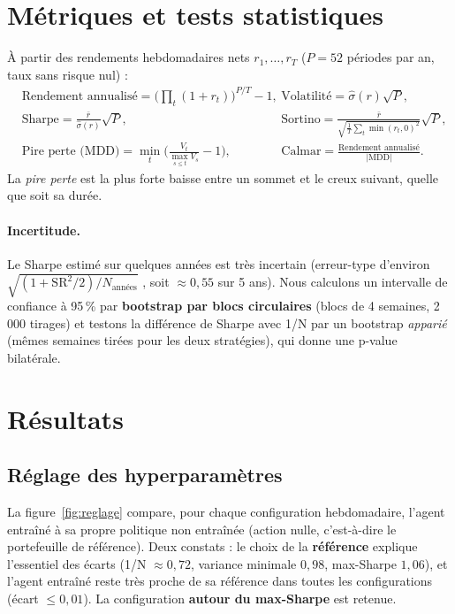 \documentclass[11pt,a4paper]{article}
\begin{document}
\section{Métriques et tests statistiques}

À partir des rendements hebdomadaires nets \(r_1,\dots,r_T\) (\(P=52\) périodes par an, taux sans risque nul) :
\begin{align*}
  &\text{Rendement annualisé} = \Big(\prod_t(1+r_t)\Big)^{P/T}-1, &&\text{Volatilité} = \hat\sigma(r)\sqrt P,\\
  &\text{Sharpe} = \frac{\bar r}{\hat\sigma(r)}\sqrt P, &&\text{Sortino} = \frac{\bar r}{\sqrt{\tfrac1T\sum_t\min(r_t,0)^2}}\sqrt P,\\
  &\text{Pire perte (MDD)} = \min_t\Big(\frac{V_t}{\max_{s\le t}V_s}-1\Big), &&\text{Calmar} = \frac{\text{Rendement annualisé}}{|\text{MDD}|}.
\end{align*}
La \emph{pire perte} est la plus forte baisse entre un sommet et le creux suivant, quelle que soit sa durée.

\paragraph{Incertitude.} Le Sharpe estimé sur quelques années est très incertain (erreur-type d'environ
\(\sqrt{(1+\mathrm{SR}^2/2)/N_{\text{années}}}\) \cite{lo2002}, soit \(\approx0{,}55\) sur 5 ans). Nous calculons
un intervalle de confiance à 95\,\% par \textbf{bootstrap par blocs circulaires} (blocs de 4 semaines,
2\,000 tirages) et testons la différence de Sharpe avec 1/N par un bootstrap \emph{apparié} (mêmes semaines
tirées pour les deux stratégies), qui donne une p-value bilatérale.

\section{Résultats}

\subsection{Réglage des hyperparamètres}
La figure~\ref{fig:reglage} compare, pour chaque configuration hebdomadaire, l'agent entraîné à sa propre
politique non entraînée (action nulle, c'est-à-dire le portefeuille de référence). Deux constats :
le choix de la \textbf{référence} explique l'essentiel des écarts (1/N \(\approx0{,}72\), variance minimale
\(0{,}98\), max-Sharpe \(1{,}06\)), et l'agent entraîné reste très proche de sa référence dans toutes les
configurations (écart \(\le0{,}01\)). La configuration \textbf{autour du max-Sharpe} est retenue.
\end{document}

